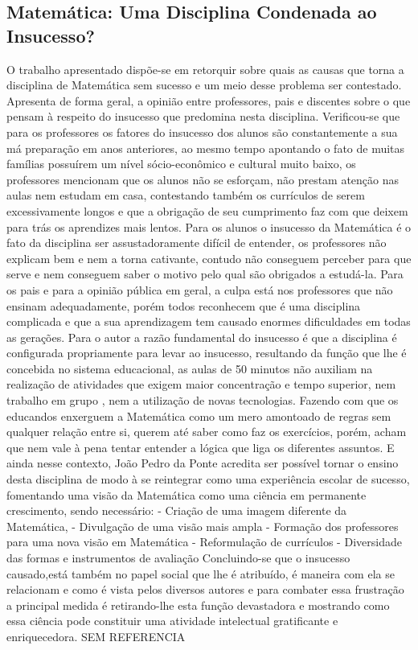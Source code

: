 \documentclass[12pt,a4paper]{article}
\begin{document}
\subsection{Matemática: Uma Disciplina Condenada ao Insucesso?}
O trabalho apresentado dispõe-se em retorquir sobre quais as causas que torna a disciplina de Matemática sem sucesso e um meio desse problema ser contestado. Apresenta de forma geral, a opinião entre professores, pais e discentes sobre o que pensam à respeito do insucesso que predomina nesta disciplina.
Verificou-se que para os professores os fatores do insucesso dos alunos são constantemente a sua má preparação em anos anteriores, ao mesmo tempo apontando o fato de muitas famílias possuírem um nível sócio-econômico e cultural muito baixo, os professores mencionam que os alunos não se esforçam, não prestam atenção nas aulas nem estudam em casa, contestando também os currículos de serem excessivamente longos e que a obrigação de seu cumprimento faz com que deixem para trás os aprendizes  mais lentos. 
Para os alunos o insucesso da Matemática é o fato da disciplina ser assustadoramente difícil de entender, os professores não explicam bem e nem a torna cativante, contudo não conseguem perceber para que serve e nem conseguem saber o motivo pelo qual são obrigados a estudá-la.
Para os pais e para a opinião pública em geral, a culpa está nos professores que não ensinam adequadamente, porém todos reconhecem que é uma disciplina complicada e que a sua aprendizagem tem causado enormes dificuldades em todas as gerações. 
Para o autor a razão fundamental do insucesso é que a disciplina é configurada propriamente para levar ao insucesso, resultando da função que lhe é concebida no sistema educacional, as aulas de 50 minutos não auxiliam na realização de atividades que exigem maior concentração e tempo superior, nem trabalho em grupo , nem a utilização de novas tecnologias. Fazendo com que os educandos enxerguem a Matemática como um mero amontoado de regras sem qualquer relação entre si, querem até saber como faz os exercícios, porém, acham que nem vale à pena tentar entender a lógica que liga os diferentes assuntos. 
E ainda nesse contexto, João Pedro da Ponte acredita ser possível tornar o ensino desta disciplina de modo à se reintegrar como uma experiência escolar de sucesso, fomentando uma visão da Matemática como uma ciência em permanente crescimento, sendo necessário: 
- Criação de uma imagem diferente da Matemática,
- Divulgação de uma visão mais ampla 
- Formação dos professores para uma nova visão em Matemática 
- Reformulação de currículos 
- Diversidade das formas e instrumentos de avaliação 
Concluindo-se que o insucesso causado,está também no papel social que lhe é atribuído, é maneira com ela se relacionam e como é vista pelos diversos autores e para combater essa frustração a principal medida é retirando-lhe esta função devastadora e mostrando como essa ciência pode constituir uma atividade intelectual gratificante e enriquecedora. SEM REFERENCIA
\end{document}
